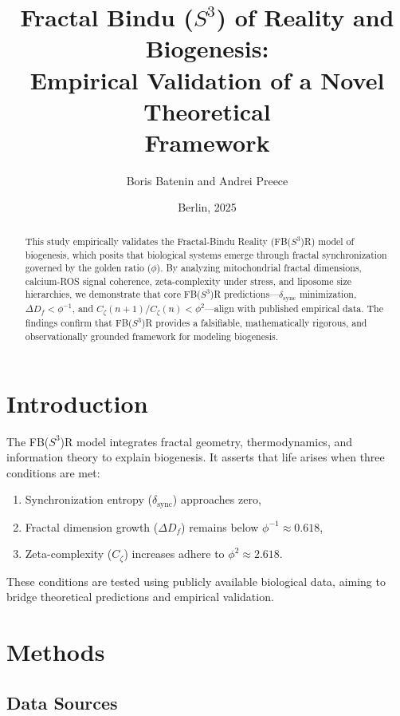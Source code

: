 \documentclass[12pt]{article}
\title{Fractal Bindu ($S^3$) of Reality and Biogenesis:\\
Empirical Validation of a Novel Theoretical\\
Framework}
\author{Boris Batenin and Andrei Preece}
\date{Berlin, 2025}
\begin{document}
\maketitle

\begin{abstract}
This study empirically validates the Fractal-Bindu Reality (FB($S^3$)R) model of biogenesis, which posits that biological systems emerge through fractal synchronization governed by the golden ratio ($\phi$). By analyzing mitochondrial fractal dimensions, calcium-ROS signal coherence, zeta-complexity under stress, and liposome size hierarchies, we demonstrate that core FB($S^3$)R predictions---$\delta_{\mathrm{sync}}$ minimization, $\Delta D_f < \phi^{-1}$, and $C_{\zeta}(n + 1)/C_{\zeta}(n) < \phi^2$---align with published empirical data. The findings confirm that FB($S^3$)R provides a falsifiable, mathematically rigorous, and observationally grounded framework for modeling biogenesis.
\end{abstract}

\section{Introduction}

The FB($S^3$)R model integrates fractal geometry, thermodynamics, and information theory to explain biogenesis. It asserts that life arises when three conditions are met:

\begin{enumerate}
\item Synchronization entropy ($\delta_{\mathrm{sync}}$) approaches zero,
\item Fractal dimension growth ($\Delta D_f$) remains below $\phi^{-1} \approx 0.618$,
\item Zeta-complexity ($C_{\zeta}$) increases adhere to $\phi^2 \approx 2.618$.
\end{enumerate}

These conditions are tested using publicly available biological data, aiming to bridge theoretical predictions and empirical validation.

\section{Methods}

\subsection*{Data Sources}
\end{document}
